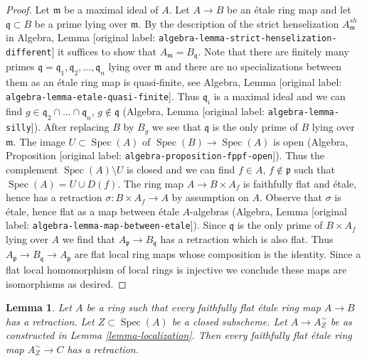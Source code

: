\documentclass[10pt,a4paper]{article}
\theoremstyle{plain}
\newtheorem{lemma}[subsection]{Lemma}
\theoremstyle{definition}
\theoremstyle{remark}
\numberwithin{equation}{subsection}
\def\Spec{\mathop{\mathrm{Spec}}}
\begin{document}
\begin{proof}
Let $\mathfrak m$ be a maximal ideal of $A$. Let $A \to B$ be an
\'etale ring map and let $\mathfrak q \subset B$ be a prime
lying over $\mathfrak m$. By the description of the strict henselization
$A_\mathfrak m^{sh}$ in
Algebra, Lemma \textnormal{[original label: \nolinkurl{algebra-lemma-strict-henselization-different}]}
it suffices to show that $A_\mathfrak m = B_\mathfrak q$.
Note that there are finitely many primes
$\mathfrak q = \mathfrak q_1, \mathfrak q_2, \ldots, \mathfrak q_n$
lying over $\mathfrak m$ and there are no specializations
between them as an \'etale ring map is quasi-finite, see
Algebra, Lemma \textnormal{[original label: \nolinkurl{algebra-lemma-etale-quasi-finite}]}.
Thus $\mathfrak q_i$ is a maximal ideal and we can find
$g \in \mathfrak q_2 \cap \ldots \cap \mathfrak q_n$, $g \not \in \mathfrak q$
(Algebra, Lemma \textnormal{[original label: \nolinkurl{algebra-lemma-silly}]}).
After replacing $B$ by $B_g$ we see that $\mathfrak q$
is the only prime of $B$ lying over $\mathfrak m$.
The image $U \subset \Spec(A)$ of $\Spec(B) \to \Spec(A)$ is
open (Algebra, Proposition \textnormal{[original label: \nolinkurl{algebra-proposition-fppf-open}]}).
Thus the complement $\Spec(A) \setminus U$ is closed
and we can find $f \in A$, $f \not \in \mathfrak p$ such that
$\Spec(A) = U \cup D(f)$. The ring map $A \to B \times A_f$
is faithfully flat and \'etale, hence has a retraction
$\sigma : B \times A_f \to A$ by assumption on $A$.
Observe that $\sigma$ is \'etale, hence flat as a map between \'etale
$A$-algebras (Algebra, Lemma \textnormal{[original label: \nolinkurl{algebra-lemma-map-between-etale}]}).
Since $\mathfrak q$ is the only prime of $B \times A_f$ lying
over $A$ we find that $A_\mathfrak p \to B_\mathfrak q$ has
a retraction which is also flat. Thus
$A_\mathfrak p \to B_\mathfrak q \to A_\mathfrak p$
are flat local ring maps whose composition is the identity. Since
a flat local homomorphism of local rings is injective we conclude these
maps are isomorphisms as desired.
\end{proof}

\begin{lemma}
\label{lemma-have-sections-localize}
Let $A$ be a ring such that every faithfully flat \'etale ring map
$A \to B$ has a retraction. Let $Z \subset \Spec(A)$ be a closed subscheme.
Let $A \to A_Z^\sim$ be as constructed in Lemma \ref{lemma-localization}.
Then every faithfully flat \'etale ring map $A_Z^\sim \to C$ has
a retraction.
\end{lemma}
\end{document}
